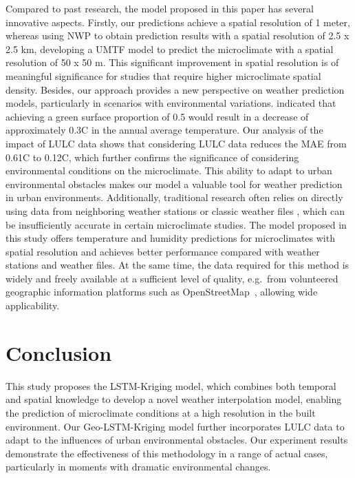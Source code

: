 \documentclass[a4paper,fleqn]{cas-sc}
\begin{document}
Compared to past research, the model proposed in this paper has several innovative aspects. Firstly, our predictions achieve a spatial resolution of 1 meter, whereas \cite{di2020mean} using NWP to obtain prediction results with a spatial resolution of 2.5 x 2.5 km, \cite{chang2021development} developing a UMTF model to predict the microclimate with a spatial resolution of 50 x 50 m. This significant improvement in spatial resolution is of meaningful significance for studies that require higher microclimate spatial density. Besides, our approach provides a new perspective on weather prediction models, particularly in scenarios with environmental variations. \cite{erell2022effect} indicated that achieving a green surface proportion of 0.5 would result in a decrease of approximately 0.3\textdegree C in the annual average temperature. Our analysis of the impact of LULC data shows that considering LULC data reduces the MAE from 0.61\textdegree C to 0.12\textdegree C, which further confirms the significance of considering environmental conditions on the microclimate. This ability to adapt to urban environmental obstacles makes our model a valuable tool for weather prediction in urban environments. Additionally, traditional research often relies on directly using data from neighboring weather stations or classic weather files \citep{kruger2013assessment,kruger2017identifying,li2020perception}, which can be insufficiently accurate in certain microclimate studies. The model proposed in this study offers temperature and humidity predictions for microclimates with spatial resolution and achieves better performance compared with weather stations and weather files. At the same time, the data required for this method is widely and freely available at a sufficient level of quality, e.g.\ from volunteered geographic information platforms such as OpenStreetMap~\citep{2023_bae_osm_qa,Herfort.2023}, allowing wide applicability.




\section{Conclusion}\label{Conclusion}

This study proposes the LSTM-Kriging model, which combines both temporal and spatial knowledge to develop a novel weather interpolation model, enabling the prediction of microclimate conditions at a high resolution in the built environment. Our Geo-LSTM-Kriging model further incorporates LULC data to adapt to the influences of urban environmental obstacles. Our experiment results demonstrate the effectiveness of this methodology in a range of actual cases, particularly in moments with dramatic environmental changes. 
\end{document}
